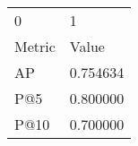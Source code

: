 \begin{tabular}{ll}
0 & 1 \\
Metric & Value \\
AP & 0.754634 \\
P@5 & 0.800000 \\
P@10 & 0.700000 \\
\end{tabular}
